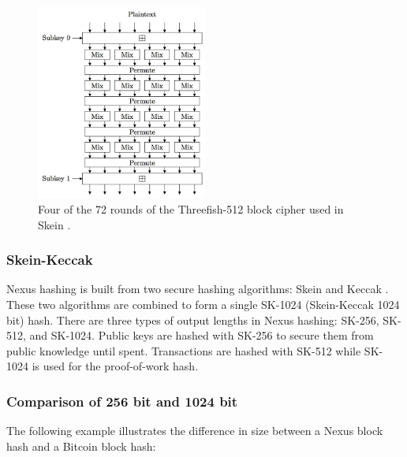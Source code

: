 \documentclass[11pt]{article}
\begin{document}
\begin{figure} %
    \caption{Four of the 72 rounds of the Threefish-512 block cipher used in Skein \cite{skeinpaper}.}
    \centering
    \includegraphics[width=0.50\textwidth]{skein-threefish-512-part.jpg}
\end{figure}

\pagebreak
\subsubsection{Skein-Keccak}

Nexus hashing is built from two secure hashing algorithms: Skein and Keccak \cite{sha3announce}. 
These two algorithms are combined to form a single SK-1024 (Skein-Keccak 1024 bit) hash. 
There are three types of output lengths in Nexus hashing: SK-256, SK-512, and SK-1024.
Public keys are hashed with SK-256 to secure them from public knowledge until spent. 
Transactions are hashed with SK-512 while SK-1024 is used for the proof-of-work hash.


\subsubsection{Comparison of 256 bit and 1024 bit}

The following example illustrates the difference in size between a Nexus block hash and a Bitcoin block hash:
\end{document}
